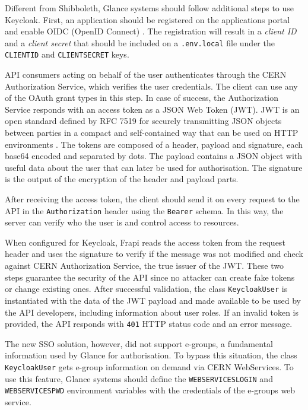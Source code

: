 Different from Shibboleth, Glance systems should follow additional steps to use Keycloak. First, an application should be registered on the applications portal and enable OIDC (OpenID Connect) \cite{registering-application} \cite{cern-auth-oidc-guide}. The registration will result in a \textit{client ID} and a \textit{client secret} that should be included on a \texttt{.env.local} file under the \texttt{CLIENT\textunderscore ID} and \texttt{CLIENT\textunderscore SECRET} keys.

API consumers acting on behalf of the user authenticates through the CERN Authorization Service, which verifies the user credentials. The client can use any of the OAuth grant types \cite{oauth-grant-type} in this step.  In case of success, the Authorization Service responds with an access token as a JSON Web Token (JWT). JWT is an open standard defined by RFC 7519 \cite{rfc-7519} for securely transmitting JSON objects between parties in a compact and self-contained way that can be used on HTTP environments \cite{jwt-introduction}. The tokens are composed of a header, payload and signature, each base64 encoded and separated by dots. The payload contains a JSON object with useful data about the user that can later be used for authorisation. The signature is the output of the encryption of the header and payload parts.


After receiving the access token, the client should send it on every request to the API in the \texttt{Authorization} header using the \texttt{Bearer} schema. In this way, the server can verify who the user is and control access to resources.


When configured for Keycloak, Frapi reads the access token from the request header and uses the signature to verify if the message was not modified and check against CERN Authorization Service, the true issuer of the JWT. These two steps guarantee the security of the API since no attacker can create fake tokens or change existing ones. After successful validation, the class \texttt{KeycloakUser} is instantiated with the data of the JWT payload and made available to be used by the API developers, including information about user roles. If an invalid token is provided, the API responds with \texttt{401} HTTP status code and an error message.

The new SSO solution, however, did not support e-groups, a fundamental information used by Glance for authorisation. To bypass this situation, the class \texttt{KeycloakUser} gets e-group information on demand via CERN WebServices. To use this feature, Glance systems should define the \texttt{WEBSERVICES\textunderscore LOGIN} and \texttt{WEBSERVICES\textunderscore PWD} environment variables with the credentials of the e-groups web service.

